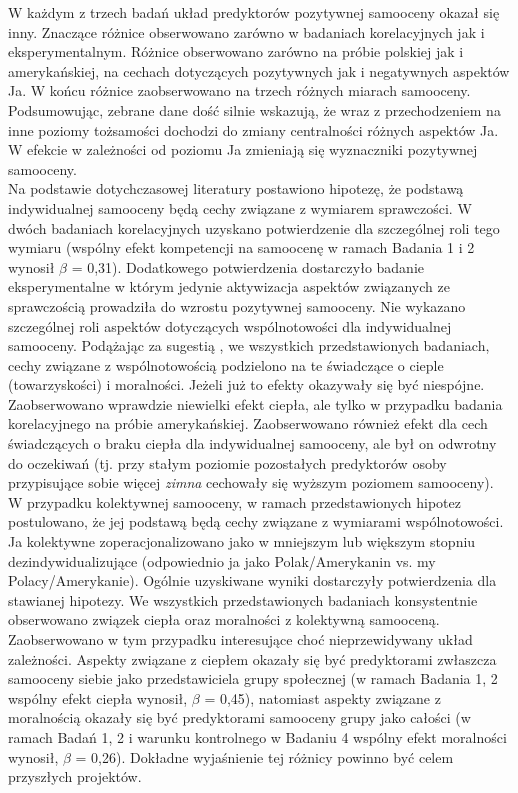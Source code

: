 \documentclass[man]{apa6}
\begin{document}
W każdym z trzech badań układ predyktorów pozytywnej samooceny okazał się inny. Znaczące różnice obserwowano zarówno w badaniach korelacyjnych jak i eksperymentalnym. Różnice obserwowano zarówno na próbie polskiej jak i amerykańskiej, na cechach dotyczących pozytywnych jak i negatywnych aspektów Ja. W końcu różnice zaobserwowano na trzech różnych miarach samooceny. Podsumowując, zebrane dane dość silnie wskazują, że wraz z przechodzeniem na inne poziomy tożsamości dochodzi do zmiany centralności różnych aspektów Ja. W efekcie w zależności od poziomu Ja zmieniają się wyznaczniki pozytywnej samooceny.\\

Na podstawie dotychczasowej literatury postawiono hipotezę, że podstawą indywidualnej samooceny będą cechy związane z wymiarem sprawczości. W dwóch badaniach korelacyjnych uzyskano potwierdzenie dla szczególnej roli tego wymiaru (wspólny efekt kompetencji na samoocenę w ramach Badania 1 i 2 wynosił $\beta$ = 0,31). Dodatkowego potwierdzenia dostarczyło badanie eksperymentalne w którym jedynie aktywizacja aspektów związanych ze sprawczością prowadziła do wzrostu pozytywnej samooceny. Nie wykazano szczególnej roli aspektów dotyczących wspólnotowości dla indywidualnej samooceny. Podążając za sugestią \textcite{brambilla2014importance}, we wszystkich przedstawionych badaniach, cechy związane z wspólnotowością podzielono na te świadczące o cieple (towarzyskości) i moralności. Jeżeli już to efekty okazywały się być niespójne. Zaobserwowano wprawdzie niewielki efekt ciepła, ale tylko w przypadku badania korelacyjnego na próbie amerykańskiej. Zaobserwowano również efekt dla cech świadczących o braku ciepła dla indywidualnej samooceny, ale był on odwrotny do oczekiwań (tj. przy stałym poziomie pozostałych predyktorów osoby przypisujące sobie więcej \emph{zimna} cechowały się wyższym poziomem samooceny).\\

W przypadku kolektywnej samooceny, w ramach przedstawionych hipotez postulowano, że jej podstawą będą cechy związane z wymiarami wspólnotowości. Ja kolektywne zoperacjonalizowano jako w mniejszym lub większym stopniu dezindywidualizujące (odpowiednio ja jako Polak/Amerykanin vs. my Polacy/Amerykanie). Ogólnie uzyskiwane wyniki dostarczyły potwierdzenia dla stawianej hipotezy. We wszystkich przedstawionych badaniach konsystentnie obserwowano związek ciepła oraz moralności z kolektywną samooceną. Zaobserwowano w tym przypadku interesujące choć nieprzewidywany układ zależności. Aspekty związane z ciepłem okazały się być predyktorami zwłaszcza samooceny siebie jako przedstawiciela grupy społecznej (w ramach Badania 1, 2 wspólny efekt ciepła wynosił, $\beta$ = 0,45), natomiast aspekty związane z moralnością okazały się być predyktorami samooceny grupy jako całości (w ramach Badań 1, 2 i warunku kontrolnego w Badaniu 4 wspólny efekt moralności wynosił, $\beta$ = 0,26). Dokładne wyjaśnienie tej różnicy powinno być celem przyszłych projektów. \\
\end{document}
